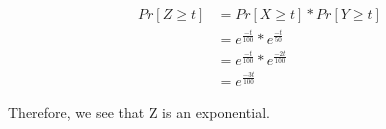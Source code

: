 \documentclass[12pt,fleqn]{article}
\begin{document}
\begin{enumerate}
\begin{enumerate}
	\begin{equation} \label{eq1}
\begin{split}
Pr[Z \geq t] & = Pr[X \geq t] * Pr[Y \geq t] \\
 & = e^{\frac{-t}{100}} * e^{\frac{-t}{50}} \\
 & = e^{\frac{-t}{100}} * e^{\frac{-2t}{100}} \\
 &= e^{\frac{-3t}{100}} 
\end{split}
\end{equation}

	Therefore, we see that Z is an exponential. 
  \end{enumerate}
  

\end{enumerate}
\end{document}
